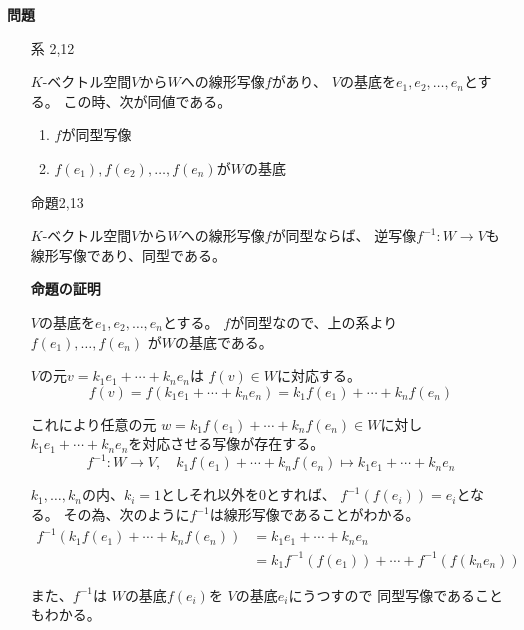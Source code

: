 \documentclass[12pt,b5paper]{ltjsarticle}
\begin{document}
\hrulefill
\textbf{問題}
\hrulefill


\begin{enumerate}
 \item [系 2,12]
       
       $K$-ベクトル空間$V$から$W$への線形写像$f$があり、
       $V$の基底を$e_1,e_2,\dots,e_n$とする。
       この時、次が同値である。
       \begin{enumerate}
        \item $f$が同型写像
        \item $f(e_1),f(e_2),\dots,f(e_n)$が$W$の基底
       \end{enumerate}

 \item [命題2,13]
       
       $K$-ベクトル空間$V$から$W$への線形写像$f$が同型ならば、
       逆写像$f^{-1}:W\to V$も線形写像であり、同型である。

       \dotfill

       \textbf{命題の証明}

       $V$の基底を$e_1,e_2,\dots,e_n$とする。
       $f$が同型なので、上の系より
       $f(e_1),\dots,f(e_n)$
       が$W$の基底である。

       $V$の元$v=k_1e_1+\cdots+k_ne_n$は
       $f(v)\in W$に対応する。
       \begin{equation}
        f(v)=f(k_1e_1+\cdots+k_ne_n)
         =k_1f(e_1)+\cdots+k_nf(e_n)
       \end{equation}

       これにより任意の元
       $w=k_1f(e_1)+\cdots+k_nf(e_n)\in W$に対し
       $k_1e_1+\cdots+k_ne_n$を対応させる写像が存在する。
       \begin{equation}
        f^{-1} : W\to V
         ,\quad
         k_1f(e_1)+\cdots+k_nf(e_n) \mapsto k_1e_1+\cdots+k_ne_n
       \end{equation}

       $k_1,\dots,k_n$の内、$k_i=1$としそれ以外を$0$とすれば、
       $f^{-1}(f(e_i))=e_i$となる。
       その為、次のように$f^{-1}$は線形写像であることがわかる。
       \begin{align}
        f^{-1}(k_1f(e_1)+\cdots+k_nf(e_n))
         &=k_1e_1+\cdots+k_ne_n\\
         &=k_1f^{-1}(f(e_1))+\cdots+f^{-1}(f(k_ne_n))
       \end{align}

       また、$f^{-1}$は
       $W$の基底$f(e_i)$を
       $V$の基底$e_i$にうつすので
       同型写像であることもわかる。


\end{enumerate}
\end{document}
